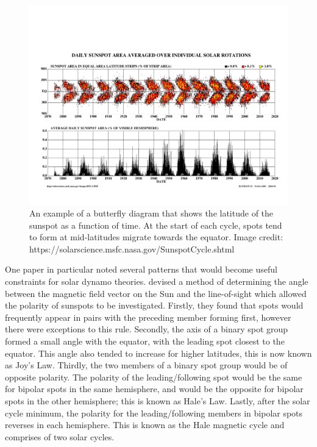 \begin{figure}
    \centering
    \includegraphics[scale=0.5]{Figures/1-Introduction/butterfly_diagram_crop.pdf}
    \caption[Butterfly diagram showing the latitudes of sunspots over a solar cycle]{An example of a butterfly diagram that shows the latitude of the sunspot as a function of time. At the start of each cycle, spots tend to form at mid-latitudes migrate towards the equator. Image credit: https://solarscience.msfc.nasa.gov/SunspotCycle.shtml}
    \label{fig:butterfly_diagram}
\end{figure}

One paper in particular noted several patterns that would become useful constraints for solar dynamo theories. \citet{Hale_etal_1919} devised a method of determining the angle between the magnetic field vector on the Sun and the line-of-sight which allowed the polarity of sunspots to be investigated. Firstly, they found that spots would frequently appear in pairs with the preceding member forming first, however there were exceptions to this rule. Secondly, the axis of a binary spot group formed a small angle with the equator, with the leading spot closest to the equator. This angle also tended to increase for higher latitudes, this is now known as Joy's Law. Thirdly, the two members of a binary spot group would be of opposite polarity. The polarity of the leading/following spot would be the same for bipolar spots in the same hemisphere, and would be the opposite for bipolar spots in the other hemisphere; this is known as Hale's Law. Lastly, after the solar cycle minimum, the polarity for the leading/following members in bipolar spots reverses in each hemisphere. This is known as the Hale magnetic cycle and comprises of two solar cycles.


